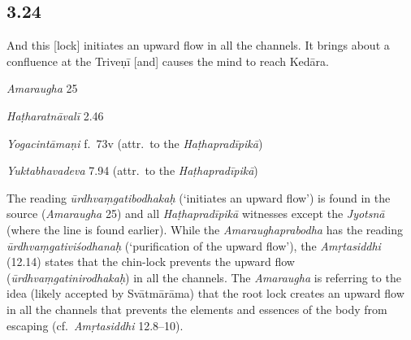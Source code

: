 \begin{ekdosis}
\subsection*{3.24}
\begin{translation}[hp03_024]
And this [lock] initiates an upward flow in all the channels. It brings about a confluence at the Triveṇī [and] causes the mind to reach Kedāra.
\end{translation}

\begin{sources}[hp03_024]
\emph{Amaraugha} 25
\begin{versinnote}
\end{versinnote}
\end{sources}

\begin{testimonia}[hp03_024]
\emph{Haṭharatnāvalī} 2.46
\begin{versinnote}
\end{versinnote}

\emph{Yogacintāmaṇi} f.~73v (attr.~to the \emph{Haṭhapradīpikā})
\begin{versinnote}
\end{versinnote}

\emph{Yuktabhavadeva} 7.94 (attr.~to the \emph{Haṭhapradīpikā})
\begin{versinnote}
\end{versinnote}
\end{testimonia}

\begin{philcomm}[hp03_024]
The reading \emph{ūrdhvaṃgatibodhakaḥ} (`initiates an upward flow') is found in the source (\emph{Amaraugha} 25) and all \emph{Haṭhapradīpikā} witnesses except the \emph{Jyotsnā} (where the line is found earlier). While the \emph{Amaraughaprabodha} has the reading \emph{ūrdhvaṃgativiśodhanaḥ} (`purification of the upward flow'), the \emph{Amṛtasiddhi} (12.14) states that the chin-lock prevents the upward flow (\emph{ūrdhvaṃgatinirodhakaḥ}) in all the channels. The \textit{Amaraugha} is referring to the idea (likely accepted by Svātmārāma) that the root lock creates an upward flow in all the channels that prevents the elements and essences of the body from escaping (cf.~\emph{Amṛtasiddhi} 12.8–10).\lb


\end{philcomm}
\end{ekdosis}
